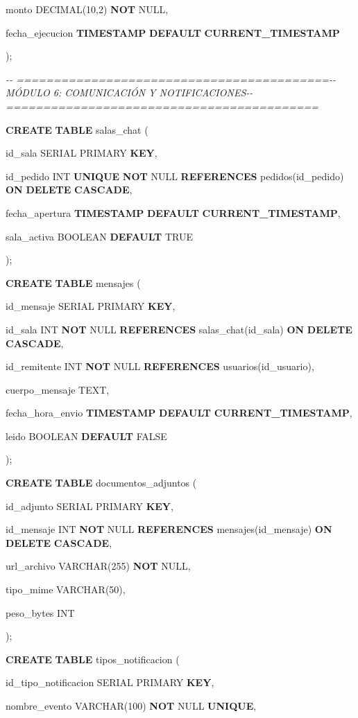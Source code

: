 \documentclass[
]{article}
\begin{document}
monto DECIMAL(10,2) \textbf{NOT} NULL,

fecha\_ejecucion \textbf{TIMESTAMP} \textbf{DEFAULT}
\textbf{CURRENT\_TIMESTAMP}

);

\emph{-\/- ==========================================-\/- MÓDULO 6:
COMUNICACIÓN Y NOTIFICACIONES-\/-
==========================================}

\textbf{CREATE} \textbf{TABLE} salas\_chat (

id\_sala SERIAL PRIMARY \textbf{KEY},

id\_pedido INT \textbf{UNIQUE} \textbf{NOT} NULL \textbf{REFERENCES}
pedidos(id\_pedido) \textbf{ON} \textbf{DELETE} \textbf{CASCADE},

fecha\_apertura \textbf{TIMESTAMP} \textbf{DEFAULT}
\textbf{CURRENT\_TIMESTAMP},

sala\_activa BOOLEAN \textbf{DEFAULT} TRUE

);

\textbf{CREATE} \textbf{TABLE} mensajes (

id\_mensaje SERIAL PRIMARY \textbf{KEY},

id\_sala INT \textbf{NOT} NULL \textbf{REFERENCES} salas\_chat(id\_sala)
\textbf{ON} \textbf{DELETE} \textbf{CASCADE},

id\_remitente INT \textbf{NOT} NULL \textbf{REFERENCES}
usuarios(id\_usuario),

cuerpo\_mensaje TEXT,

fecha\_hora\_envio \textbf{TIMESTAMP} \textbf{DEFAULT}
\textbf{CURRENT\_TIMESTAMP},

leido BOOLEAN \textbf{DEFAULT} FALSE

);

\textbf{CREATE} \textbf{TABLE} documentos\_adjuntos (

id\_adjunto SERIAL PRIMARY \textbf{KEY},

id\_mensaje INT \textbf{NOT} NULL \textbf{REFERENCES}
mensajes(id\_mensaje) \textbf{ON} \textbf{DELETE} \textbf{CASCADE},

url\_archivo VARCHAR(255) \textbf{NOT} NULL,

tipo\_mime VARCHAR(50),

peso\_bytes INT

);

\textbf{CREATE} \textbf{TABLE} tipos\_notificacion (

id\_tipo\_notificacion SERIAL PRIMARY \textbf{KEY},

nombre\_evento VARCHAR(100) \textbf{NOT} NULL \textbf{UNIQUE},
\end{document}

